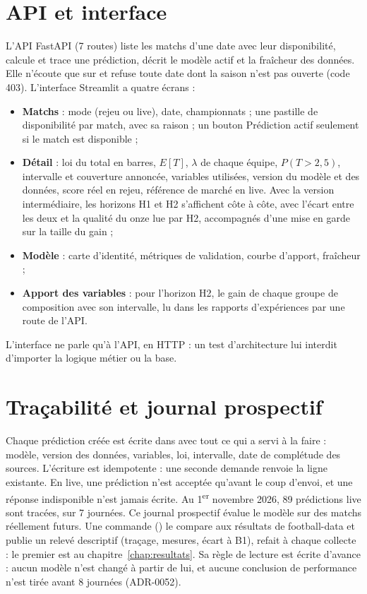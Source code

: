 \section{API et interface}

L'API FastAPI (7 routes) liste les matchs d'une date avec leur disponibilité, calcule et trace une
prédiction, décrit le modèle actif et la fraîcheur des données. Elle n'écoute que sur 
et refuse toute date dont la saison n'est pas ouverte (code 403). L'interface Streamlit a quatre écrans :

\begin{itemize}
  \item \textbf{Matchs} : mode (rejeu ou live), date, championnats ; une pastille de disponibilité par
        match, avec sa raison ; un bouton \og Prédiction \fg{} actif seulement si le match est
        disponible ;
  \item \textbf{Détail} : loi du total en barres, \(E[T]\), \(\lambda\) de chaque équipe, \(P(T > 2{,}5)\),
        intervalle et couverture annoncée, variables utilisées, version du modèle et des données, score
        réel en rejeu, référence de marché en live. Avec la version intermédiaire, les horizons H1 et H2
        s'affichent côte à côte, avec l'écart entre les deux et la qualité du onze lue par H2, accompagnés
        d'une mise en garde sur la taille du gain ;
  \item \textbf{Modèle} : carte d'identité, métriques de validation, courbe d'apport, fraîcheur ;
  \item \textbf{Apport des variables} : pour l'horizon H2, le gain de chaque groupe de composition avec son
        intervalle, lu dans les rapports d'expériences par une route de l'API.
\end{itemize}

L'interface ne parle qu'à l'API, en HTTP : un test d'architecture lui interdit d'importer la logique
métier ou la base.

\section{Traçabilité et journal prospectif}

Chaque prédiction créée est écrite dans  avec tout ce qui a servi à la faire :
modèle, version des données, variables, loi, intervalle, date de complétude des sources. L'écriture est
idempotente : une seconde demande renvoie la ligne existante. En live, une prédiction n'est acceptée
qu'avant le coup d'envoi, et une réponse indisponible n'est jamais écrite. Au 1\textsuperscript{er}
novembre 2026, 89 prédictions live sont tracées, sur 7 journées. Ce journal prospectif évalue le modèle sur
des matchs réellement futurs. Une commande () le compare aux résultats de
football-data et publie un relevé descriptif (traçage, mesures, écart à B1), refait à chaque collecte : le
premier est au chapitre~\ref{chap:resultats}. Sa règle de lecture est écrite d'avance : aucun modèle n'est
changé à partir de lui, et aucune conclusion de performance n'est tirée avant 8 journées (ADR-0052).

